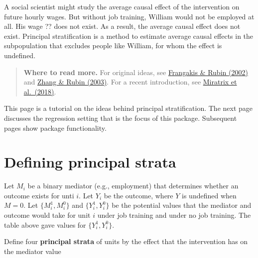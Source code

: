 \documentclass[
]{book}
\begin{document}
A social scientist might study the average causal effect of the intervention on future hourly wages. But without job training, William would not be employed at all. His wage ?? does not exist. As a result, the average causal effect does not exist. Principal stratification is a method to estimate average causal effects in the subpopulation that excludes people like William, for whom the effect is undefined.

\begin{quote}
\textbf{Where to read more.} For original ideas, see \href{https://doi.org/10.1111/j.0006-341X.2002.00021.x}{Frangakis \& Rubin (2002)} and \href{https://doi.org/10.3102/10769986028004353}{Zhang \& Rubin (2003)}. For a recent introduction, see \href{https://doi.org/10.1080/19345747.2017.1379576}{Miratrix et al.~(2018)}.
\end{quote}

This page is a tutorial on the ideas behind principal stratification. The next page discusses the regression setting that is the focus of this package. Subsequent pages show package functionality.

\section{Defining principal strata}\label{defining-principal-strata}

Let \(M_i\) be a binary mediator (e.g., employment) that determines whether an outcome exists for unti \(i\). Let \(Y_i\) be the outcome, where \(Y\) is undefined when \(M = 0\). Let \(\{M_i^1,M_i^0\}\) and \(\{Y_i^1,Y_i^0\}\) be the potential values that the mediator and outcome would take for unit \(i\) under job training and under no job training. The table above gave values for \(\{Y_i^1,Y_i^0\}\).

Define four \textbf{principal strata} of units by the effect that the intervention has on the mediator value
\end{document}
